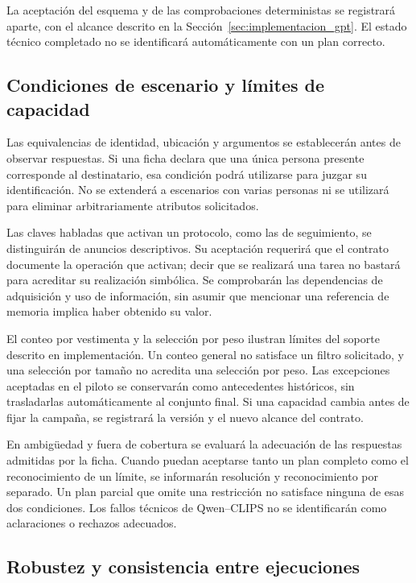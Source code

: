 La aceptación del esquema y de las comprobaciones deterministas se
registrará aparte, con el alcance descrito en la
Sección~\ref{sec:implementacion_gpt}. El estado técnico completado no
se identificará automáticamente con un plan correcto.

\subsection{Condiciones de escenario y límites de capacidad}

Las equivalencias de identidad, ubicación y argumentos se establecerán
antes de observar respuestas. Si una ficha declara que una única persona
presente corresponde al destinatario, esa condición podrá utilizarse para
juzgar su identificación. No se extenderá a escenarios con varias personas
ni se utilizará para eliminar arbitrariamente atributos solicitados.

Las claves habladas que activan un protocolo, como las de seguimiento,
se distinguirán de anuncios descriptivos. Su aceptación requerirá que el
contrato documente la operación que activan; decir que se realizará una
tarea no bastará para acreditar su realización simbólica. Se comprobarán
las dependencias de adquisición y uso de información, sin asumir que
mencionar una referencia de memoria implica haber obtenido su valor.

El conteo por vestimenta y la selección por peso ilustran límites del
soporte descrito en implementación. Un conteo general no satisface un
filtro solicitado, y una selección por tamaño no acredita una selección
por peso. Las excepciones aceptadas en el piloto se conservarán como
antecedentes históricos, sin trasladarlas automáticamente al conjunto
final. Si una capacidad cambia antes de fijar la campaña, se registrará
la versión y el nuevo alcance del contrato.

En ambigüedad y fuera de cobertura se evaluará la adecuación de las
respuestas admitidas por la ficha. Cuando puedan aceptarse tanto un plan
completo como el reconocimiento de un límite, se informarán resolución
y reconocimiento por separado. Un plan parcial que omite una restricción
no satisface ninguna de esas dos condiciones. Los fallos técnicos de
Qwen--CLIPS no se identificarán como aclaraciones o rechazos adecuados.

\subsection{Robustez y consistencia entre ejecuciones}
\label{sec:robustez_cap6}

